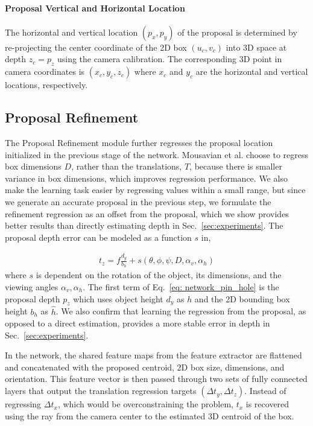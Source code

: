 \documentclass[10pt,twocolumn,letterpaper]{article}
\begin{document}
	\paragraph{Proposal Vertical and Horizontal Location}
	The horizontal and vertical location $(p_x, p_y)$ of the proposal is determined by re-projecting the center coordinate of the 2D box $(u_c, v_c)$ into 3D space at depth $z_c = p_z$ using the camera calibration. The corresponding 3D point in camera coordinates is $(x_c, y_c, z_c)$ where $x_c$ and $y_c$ are the horizontal and vertical locations, respectively.
	
	\subsection{Proposal Refinement}
	The Proposal Refinement module further regresses the proposal location initialized in the previous stage of the network. Mousavian et al. \cite{mousavian_deep3dbox} choose to regress box dimensions $D$, rather than the translations, $T$, because there is smaller variance in box dimensions, which improves regression performance. We also make the learning task easier by regressing values within a small range, but since we generate an accurate proposal in the previous step, we formulate the refinement regression as an offset from the proposal, which we show provides better results than directly estimating depth in Sec.~\ref{sec:experiments}. The proposal depth error can be modeled as a function $s$ in,
	
	\begin{equation}
	\begin{aligned}
	t_z = f \frac{{{d_y}}}{b_{h}} + s(\theta, \phi, \psi, D, \alpha_v, \alpha_h)
	\end{aligned}
	\label{eq: network_pin_hole}
	\end{equation}
where $s$ is dependent on the rotation of the object, its dimensions, and the viewing angles $\alpha_v, \alpha_h$. The first term of Eq.~\ref{eq: network_pin_hole} is the proposal depth $p_z$ which uses object height $d_y$ as $h$ and the 2D bounding box height $b_{h}$ as $\hat{h}$. We also confirm that learning the regression from the proposal, as opposed to a direct estimation, provides a more stable error in depth in Sec.~\ref{sec:experiments}.
	
	In the network, the shared feature maps from the feature extractor are flattened and concatenated with the proposed centroid, 2D box size, dimensions, and orientation. This feature vector is then passed through two sets of fully connected layers that output the translation regression targets $(\Delta t_y, \Delta t_z)$. Instead of regressing $\Delta t_x$, which would be overconstraining the problem, $t_x$ is recovered using the ray from the camera center to the estimated 3D centroid of the box.
	
\end{document}
